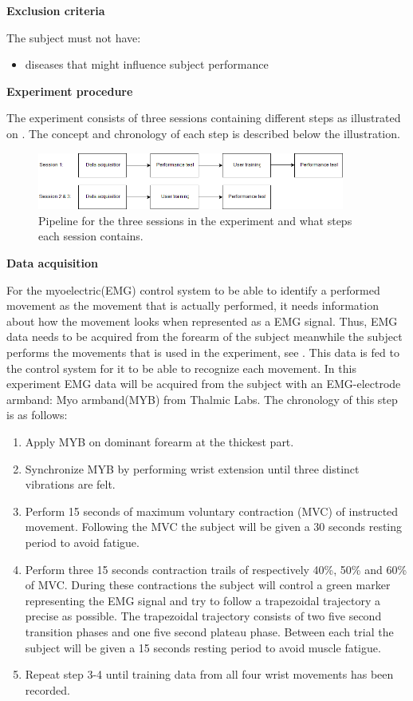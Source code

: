 \textbf{Exclusion criteria}

The subject must not have:
\begin{itemize}
	\item diseases that might influence subject performance   
\end{itemize}


\textbf{\Large{Experiment procedure}}

The experiment consists of three sessions containing different steps as illustrated on . The concept and chronology of each step is described below the illustration.


\begin{figure}[H]                                         
	\includegraphics[width=0.9\textwidth]{figures/pMethods/experiment_protocol_pipeline}  
	\caption{Pipeline for the three sessions in the experiment and what steps each session contains.}
	\label{fig:experiment_protocol_pipeline} 
\end{figure}  


\textbf{Data acquisition}

For the myoelectric(EMG) control system to be able to identify a performed movement as the movement that is actually performed, it needs information about how the movement looks when represented as a EMG signal. Thus, EMG data needs to be acquired from the forearm of the subject meanwhile the subject performs the movements that is used in the experiment, see . This data is fed to the control system for it to be able to recognize each movement. In this experiment EMG data will be acquired from the subject with an EMG-electrode armband: Myo armband(MYB) from Thalmic Labs. The chronology of this step is as follows:

\begin{enumerate}
	\item Apply MYB on dominant forearm at the thickest part.
	\item Synchronize MYB by performing wrist extension until three distinct vibrations are felt.
	\item Perform 15 seconds of maximum voluntary contraction (MVC) of instructed movement. Following the MVC the subject will be given a 30 seconds resting period to avoid fatigue.
	\item Perform three 15 seconds contraction trails of respectively 40\%, 50\% and 60\% of MVC. During these contractions the subject will control a green marker representing the EMG signal and try to follow a trapezoidal trajectory a precise as possible. The trapezoidal trajectory consists of two five second transition phases and one five second plateau phase. Between each trial the subject will be given a 15 seconds resting period to avoid muscle fatigue.
	\item Repeat step 3-4 until training data from all four wrist movements has been recorded.
\end{enumerate}


